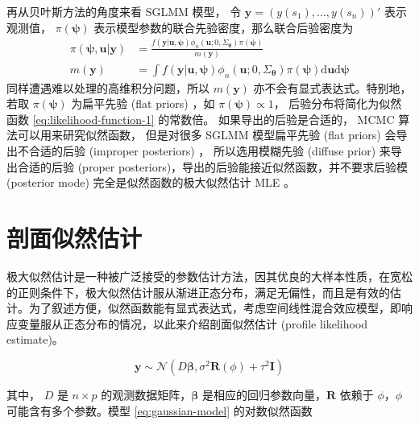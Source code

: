 \documentclass[12pt,a4paper,UTF8,twoside]{book}
\theoremstyle{definition}
\theoremstyle{definition}
\theoremstyle{definition}
\theoremstyle{remark}
\begin{document}
再从贝叶斯方法的角度来看 SGLMM 模型， 令
\(\mathbf{y} = (y(s_1),\ldots,y(s_n))'\) 表示观测值，
\(\pi(\boldsymbol{\psi})\)
表示模型参数的联合先验密度，那么联合后验密度为 \begin{equation}
\begin{aligned}
\pi(\boldsymbol{\psi},\mathbf{u}|\mathbf{y}) &= \frac{f(\mathbf{y|\mathbf{u}, \boldsymbol{\psi}})\phi_{n}(\mathbf{u};0,\Sigma_{\boldsymbol{\theta}})\pi(\boldsymbol{\psi})}{m(\mathbf{y})} \\
m(\mathbf{y}) &= \int f(\mathbf{y|\mathbf{u}, \boldsymbol{\psi}})\phi_{n}(\mathbf{u};0,\Sigma_{\boldsymbol{\theta}})\pi(\boldsymbol{\psi})\mathrm{d} \mathbf{u} \mathrm{d} \boldsymbol{\psi}
\end{aligned}
\end{equation} \noindent 同样遭遇难以处理的高维积分问题，所以
\(m(\mathbf{y})\) 亦不会有显式表达式。特别地，若取
\(\pi(\boldsymbol{\psi})\) 为扁平先验 (flat priors) ，如
\(\pi(\boldsymbol{\psi}) \propto 1\)， 后验分布将简化为似然函数
\eqref{eq:likelihood-function-1} 的常数倍。 如果导出的后验是合适的， MCMC
算法可以用来研究似然函数， 但是对很多 SGLMM 模型扁平先验 (flat priors)
会导出不合适的后验 (improper posteriors) \citep{Natarajan1995}，
所以选用模糊先验 (diffuse prior) 来导出合适的后验 (proper
posteriors)，导出的后验能接近似然函数，并不要求后验模 (posterior mode)
完全是似然函数的极大似然估计 MLE \citep{Robert1996JASA}。

\hypertarget{sec:profile-likelihood}{%
\section{剖面似然估计}\label{sec:profile-likelihood}}

极大似然估计是一种被广泛接受的参数估计方法，因其优良的大样本性质，在宽松的正则条件下，极大似然估计服从渐进正态分布，满足无偏性，而且是有效的估计。为了叙述方便，似然函数能有显式表达式，考虑空间线性混合效应模型，即响应变量服从正态分布的情况，以此来介绍剖面似然估计
(profile likelihood estimate)。

\begin{equation}
\mathbf{y} \sim \mathcal{N}(D\boldsymbol{\beta},\sigma^2 \mathbf{R}(\phi) + \tau^2\mathbf{I})
\label{eq:gaussian-model}
\end{equation}

\noindent 其中， \(D\) 是 \(n \times p\)
的观测数据矩阵，\(\boldsymbol{\beta}\)
是相应的回归参数向量，\(\mathbf{R}\) 依赖于 \(\phi\)，\(\phi\)
可能含有多个参数。模型 \eqref{eq:gaussian-model} 的对数似然函数
\end{document}
